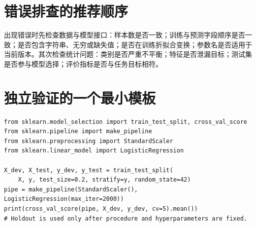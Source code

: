 \section{错误排查的推荐顺序}
出现错误时先检查数据与模型接口：样本数是否一致；训练与预测字段顺序是否一致；是否包含字符串、无穷或缺失值；是否在训练折拟合变换；参数名是否适用于当前版本。其次检查统计问题：类别是否严重不平衡；特征是否泄漏目标；测试集是否参与模型选择；评价指标是否与任务目标相符。
\section{独立验证的一个最小模板}
\begin{lstlisting}[caption={保留数据与开发集交叉验证的骨架}]
from sklearn.model_selection import train_test_split, cross_val_score
from sklearn.pipeline import make_pipeline
from sklearn.preprocessing import StandardScaler
from sklearn.linear_model import LogisticRegression

X_dev, X_test, y_dev, y_test = train_test_split(
    X, y, test_size=0.2, stratify=y, random_state=42)
pipe = make_pipeline(StandardScaler(), LogisticRegression(max_iter=2000))
print(cross_val_score(pipe, X_dev, y_dev, cv=5).mean())
# Holdout is used only after procedure and hyperparameters are fixed.
\end{lstlisting}



